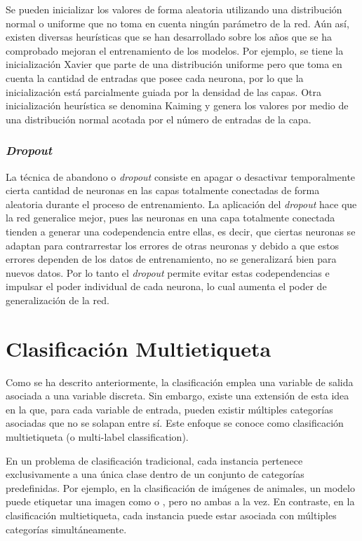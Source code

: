 Se pueden inicializar los valores de forma aleatoria utilizando una distribución normal o uniforme que no toma en cuenta ningún parámetro de la red. Aún así, existen diversas heurísticas que se han desarrollado sobre los años que se ha comprobado mejoran el entrenamiento de los modelos. Por ejemplo, se tiene la inicialización Xavier \cite{glorot2010understanding} que parte de una distribución uniforme pero que toma en cuenta la cantidad de entradas que posee cada neurona, por lo que la inicialización está parcialmente guiada por la densidad de las capas. Otra inicialización heurística se denomina Kaiming \cite{he2015delving} y genera los valores por medio de una distribución normal acotada por el número de entradas de la capa.

\subsubsection{\textit{Dropout}}
La técnica de abandono o \textit{dropout} consiste en apagar o desactivar temporalmente cierta cantidad de neuronas en las capas totalmente conectadas de forma aleatoria durante el proceso de entrenamiento. La aplicación del \textit{dropout} hace que la red generalice mejor, pues las neuronas en una capa totalmente conectada tienden a generar una codependencia entre ellas, es decir, que ciertas neuronas se adaptan para contrarrestar los errores de otras neuronas y debido a que estos errores dependen de los datos de entrenamiento, no se generalizará bien para nuevos datos. Por lo tanto el \textit{dropout} permite evitar estas codependencias e impulsar el poder individual de cada neurona, lo cual aumenta el poder de generalización de la red.

\section{Clasificación Multietiqueta}
Como se ha descrito anteriormente, la clasificación emplea una variable de salida asociada a una variable discreta. Sin embargo, existe una extensión de esta idea en la que, para cada variable de entrada, pueden existir múltiples categorías asociadas que no se solapan entre sí. Este enfoque se conoce como clasificación multietiqueta (o multi-label classification).

En un problema de clasificación tradicional, cada instancia pertenece exclusivamente a una única clase dentro de un conjunto de categorías predefinidas. Por ejemplo, en la clasificación de imágenes de animales, un modelo puede etiquetar una imagen como  o , pero no ambas a la vez. En contraste, en la clasificación multietiqueta, cada instancia puede estar asociada con múltiples categorías simultáneamente.

